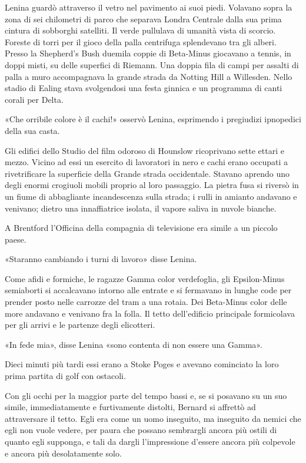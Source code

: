 \documentclass[
a5paper, %
10pt, %
twoside, 
onecolumn, %
openany, %
]{memoir}
\begin{document}
Lenina guardò attraverso il vetro nel pavimento ai suoi piedi. Volavano sopra la zona di sei chilometri di parco che separava Londra Centrale dalla sua prima cintura di sobborghi satelliti. Il verde pullulava di umanità vista di scorcio. Foreste di torri per il gioco della palla centrifuga splendevano tra gli alberi. Presso la Shepherd’s Bush duemila coppie di Beta-Minus giocavano a tennis, in doppi misti, su delle superfici di Riemann. Una doppia fila di campi per assalti di palla a muro accompagnava la grande strada da Notting Hill a Willesden. Nello stadio di Ealing stava svolgendosi una festa ginnica e un programma di canti corali per Delta.

«Che orribile colore è il cachi!» osservò Lenina, esprimendo i pregiudizi ipnopedici della sua casta.

Gli edifici dello Studio del film odoroso di Hounslow ricoprivano sette ettari e mezzo. Vicino ad essi un esercito di lavoratori in nero e cachi erano occupati a rivetrificare la superficie della Grande strada occidentale. Stavano aprendo uno degli enormi crogiuoli mobili proprio al loro passaggio. La pietra fusa si riversò in un fiume di abbagliante incandescenza sulla strada; i rulli in amianto andavano e venivano; dietro una innaffiatrice isolata, il vapore saliva in nuvole bianche.

A Brentford l’Officina della compagnia di televisione era simile a un piccolo paese.

«Staranno cambiando i turni di lavoro» disse Lenina.

Come afidi e formiche, le ragazze Gamma color verdefoglia, gli Epsilon-Minus semiaborti si accalcavano intorno alle entrate e si fermavano in lunghe code per prender posto nelle carrozze del tram a una rotaia. Dei Beta-Minus color delle more andavano e venivano fra la folla. Il tetto dell’edificio principale formicolava per gli arrivi e le partenze degli elicotteri.

«In fede mia», disse Lenina «sono contenta di non essere una Gamma».

Dieci minuti più tardi essi erano a Stoke Poges e avevano cominciato la loro prima partita di golf con ostacoli.

\newpage

\begin{center}
    {\huge\textbf{}}
\end{center}

Con gli occhi per la maggior parte del tempo bassi e, se si posavano su un suo simile, immediatamente e furtivamente distolti, Bernard si affrettò ad attraversare il tetto. Egli era come un uomo inseguito, ma inseguito da nemici che egli non vuole vedere, per paura che possano sembrargli ancora più ostili di quanto egli supponga, e tali da dargli l’impressione d’essere ancora più colpevole e ancora più desolatamente solo.
\end{document}

